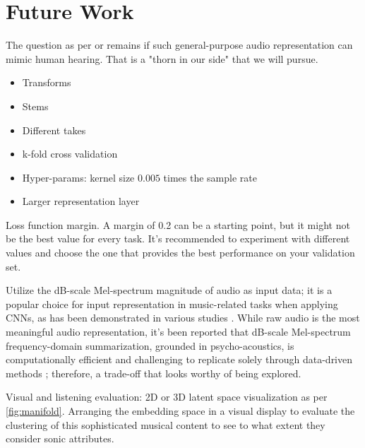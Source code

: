 \chapter{Future Work}

The question as per \cite{Turian2022HEAR:Representations} or \cite{Li2023MERT:Training} remains if such general-purpose audio representation can mimic human hearing. That is a "thorn in our side" that we will pursue.

\begin{itemize}
  \item Transforms
  \item Stems
  \item Different takes
  \item k-fold cross validation
  \item Hyper-params: kernel size $0.005$ times the sample rate
  \item Larger representation layer
\end{itemize}

Loss function margin. A margin of 0.2 can be a starting point, but it might not be the best value for every task. It's recommended to experiment with different values and choose the one that provides the best performance on your validation set.

Utilize the dB-scale Mel-spectrum magnitude of audio as input data; it is a popular choice for input representation in music-related tasks when applying CNNs, as has been demonstrated in various studies \cite{Kim2020OneStrategies}. While raw audio is the most meaningful audio representation, it's been reported that dB-scale Mel-spectrum frequency-domain summarization, grounded in psycho-acoustics, is computationally efficient and challenging to replicate solely through data-driven methods \cite{Kim2020OneStrategies}; therefore, a trade-off that looks worthy of being explored.

Visual and listening evaluation: 2D or 3D latent space visualization as per \ref{fig:manifold}. Arranging the embedding space in a visual display to evaluate the clustering of this sophisticated musical content to see to what extent they consider sonic attributes. 



\newpage